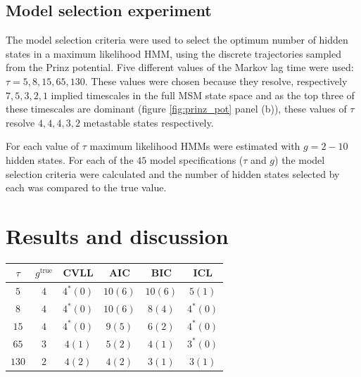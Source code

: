 \subsection{Model selection experiment}
The model selection criteria were used to select the optimum number of hidden states in a maximum likelihood HMM, using the discrete trajectories sampled from the Prinz potential. Five different values of the Markov lag time were used: $\tau=5, 8, 15, 65, 130$. These values were chosen because they resolve, respectively $7, 5, 3, 2, 1$ implied timescales in the full MSM state space and as the top three of these timescales are dominant (figure \ref{fig:prinz_pot} panel (b)), these values of $\tau$ resolve $4, 4, 4, 3, 2$ metastable states  respectively.\cite{noeProjectedHiddenMarkov2013a} 

For each value of $\tau$ maximum likelihood HMMs were estimated with $g = 2 - 10$ hidden states. For each of the $45$ model specifications ($\tau$ and $g$) the model selection criteria were calculated  and the number of hidden states selected by each was compared to the true value. 

\section{Results and discussion}\label{sec:hmm_results}
\begin{table}
    \centering
    \begin{tabular}{|c|c|c|c|c|c|}
    \hline
    $\tau$ & $g^{\mathrm{true}}$ & CVLL & AIC & BIC & ICL  \\
    \hline\hline
     $5$  & $4$ & $4^{*} (0)$  & $10 (6)$ & $10 (6)$ & $5 (1)$ \\
     $8$  & $4$ & $4^{*} (0)$ & $10 (6)$ & $8 (4)$  & $4^{*} (0)$  \\
     $15$ & $4$ & $4^{*} (0)$  & $9 (5)$ & $6 (2)$  & $4^{*} (0)$  \\
     $65 $& $3$ & $4 (1)$  & $5 (2)$  & $4 (1)$  & $3^{*} (0)$  \\
     $130$& $2$ & $4 (2)$  & $4 (2)$  & $3 (1)$  & $3 (1)$  \\
     \hline
    \end{tabular}
    \label{tab:prinz_criteria_results}
\end{table}

